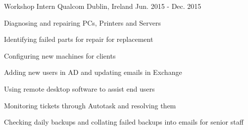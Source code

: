 \begin{cventries}
  \cventry
    {Workshop Intern} %
    {Qualcom} %
    {Dublin, Ireland} %
    {Jun. 2015 - Dec. 2015} %
    {
      \begin{cvitems} %
        \item {Diagnosing and repairing PCs, Printers and Servers}
        \item {Identifying failed parts for repair for replacement}
        \item {Configuring new machines for clients}
        \item {Adding new users in AD and updating emails in Exchange}
        \item {Using remote desktop software to assist end users}
        \item {Monitoring tickets through Autotask and resolving them}
        \item {Checking daily backups and collating failed backups into emails for senior staff}
      \end{cvitems}
    }
\end{cventries}

